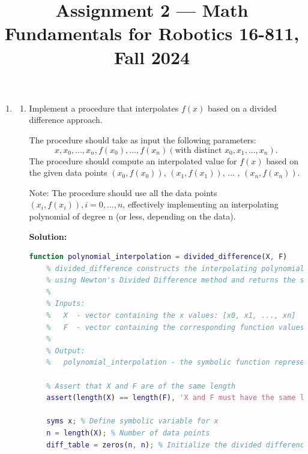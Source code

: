 \documentclass[conference,onecolumn]{IEEEtran}
\begin{document}
\title{\Large Assignment 2 --- Math Fundamentals for Robotics 16-811, Fall 2024}

\author{
}

\maketitle

\begin{enumerate}[label=\arabic{enumi}.]
    \item \begin{enumerate}
              \item Implement a procedure that interpolates $f(x)$ based on a divided difference approach.

                    The procedure should take as input the following parameters:
                    $$
                        x, x_0, ... , x_n, f(x_0), ... , f(x_n) (\text{with distinct } x_0, x_1, ... , x_n).
                    $$
                    The procedure should compute an interpolated value for $f(x)$ based on the given data points $(x_0, f(x_0))$, $(x_1, f(x_1))$, ... , $(x_n, f(x_n))$.

                    Note: The procedure should use all the data points $(x_i, f(x_i)), i = 0, ... , n$, effectively implementing an interpolating polynomial of degree n (or less, depending on the data).

                    \textbf{Solution:}

                    \begin{lstlisting}[language=MATLAB]
function polynomial_interpolation = divided_difference(X, F)
    % divided_difference constructs the interpolating polynomial
    % using Newton's Divided Difference method and returns the symbolic function.
    %
    % Inputs:
    %   X  - vector containing the x values: [x0, x1, ..., xn]
    %   F  - vector containing the corresponding function values: [f(x0), f(x1), ..., f(xn)]
    %
    % Output:
    %   polynomial_interpolation - the symbolic function representing the interpolating polynomial

    % Assert that X and F are of the same length
    assert(length(X) == length(F), 'X and F must have the same length.');

    syms x; % Define symbolic variable for x
    n = length(X); % Number of data points
    diff_table = zeros(n, n); % Initialize the divided difference table


\end{lstlisting}
\end{enumerate}
\end{enumerate}
\end{document}
